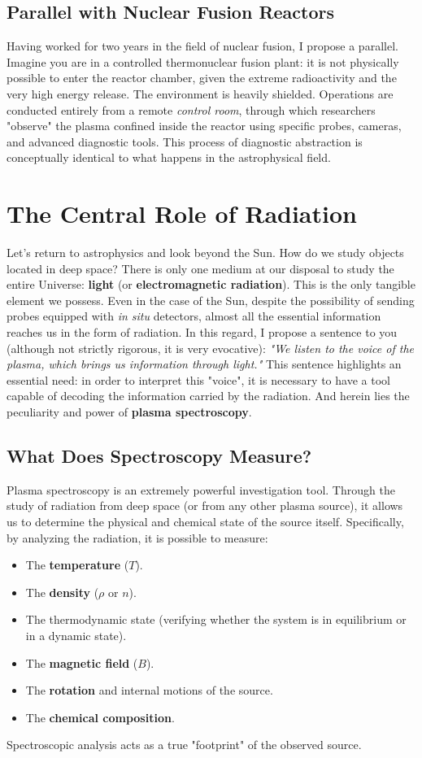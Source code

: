     \subsection{Parallel with Nuclear Fusion Reactors}
    Having worked for two years in the field of nuclear fusion, I propose a parallel. Imagine you are in a controlled thermonuclear fusion plant: it is not physically possible to enter the reactor chamber, given the extreme radioactivity and the very high energy release. The environment is heavily shielded. Operations are conducted entirely from a remote \textit{control room}, through which researchers "observe" the plasma confined inside the reactor using specific probes, cameras, and advanced diagnostic tools. This process of diagnostic abstraction is conceptually identical to what happens in the astrophysical field.\section{The Central Role of Radiation}Let's return to astrophysics and look beyond the Sun. How do we study objects located in deep space? There is only one medium at our disposal to study the entire Universe: \textbf{light} (or \textbf{electromagnetic radiation}). This is the only tangible element we possess. Even in the case of the Sun, despite the possibility of sending probes equipped with \textit{in situ} detectors, almost all the essential information reaches us in the form of radiation. In this regard, I propose a sentence to you (although not strictly rigorous, it is very evocative): \textit{"We listen to the voice of the plasma, which brings us information through light."} This sentence highlights an essential need: in order to interpret this "voice", it is necessary to have a tool capable of decoding the information carried by the radiation. And herein lies the peculiarity and power of \textbf{plasma spectroscopy}.
    
    \subsection{What Does Spectroscopy Measure?}
    Plasma spectroscopy is an extremely powerful investigation tool. Through the study of radiation from deep space (or from any other plasma source), it allows us to determine the physical and chemical state of the source itself. Specifically, by analyzing the radiation, it is possible to measure:\begin{itemize}\item The \textbf{temperature} ($T$).\item The \textbf{density} ($\rho$ or $n$).\item The thermodynamic state (verifying whether the system is in equilibrium or in a dynamic state).\item The \textbf{magnetic field} ($B$).\item The \textbf{rotation} and internal motions of the source.\item The \textbf{chemical composition}.\end{itemize}Spectroscopic analysis acts as a true "footprint" of the observed source.
    
